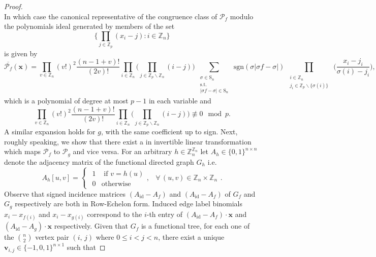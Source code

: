 \begin{proof}
\[\]
In which case the canonical representative of the congruence class of $\mathcal{P}_f$ modulo the polynomials ideal generated by members of the set
\[
\bigg\{\prod_{j\in\mathbb{Z}_{p}}(x_{i}-j):i\in\mathbb{Z}_{n}\bigg\}
\]
is given by
\begin{equation} \label{eq:new-graceful-evaluation}
\overline{\mathcal{P}_{f}}(\mathbf{x})=\prod_{v\in\mathbb{Z}_{n}}(v!)^{2}\frac{(n-1+v)!}{(2v)!}\prod_{i\in\mathbb{Z}_{n}}\big(\prod_{j\in\mathbb{Z}_{p}\backslash\mathbb{Z}_{n}}(i-j)\big)\sum_{\begin{array}{c}
\substack{\sigma\in\text{S}_{n}\\
\text{s.t.}\\
\left|\sigma f-\sigma\right|\in\text{S}_{n}
}
\end{array}}\text{sgn}(\sigma\left|\sigma f-\sigma\right|)\prod_{\begin{array}{c}
\substack{i\in\mathbb{Z}_{n}\\
j_{i}\in\mathbb{Z}_{p}\backslash\{\sigma(i)\}
}
\end{array}}\big(\frac{x_{i}-j_{i}}{\sigma(i)-j_{i}}\big),
\end{equation}
which is a polynomial of degree at most $p-1$ in each variable and
\[
\prod_{v\in\mathbb{Z}_{n}}(v!)^{2}\frac{(n-1+v)!}{(2v)!}\prod_{i\in\mathbb{Z}_{n}}\big(\prod_{j\in\mathbb{Z}_{p}\backslash\mathbb{Z}_{n}}(i-j)\big)\not\equiv0\mod p.
\]
A similar expansion holds for $g$, with the same coefficient up to sign. Next, roughly speaking, we show that there exist a in invertible linear transformation which  maps $\mathcal{P}_f$ to $\mathcal{P}_g$ and vice versa. For an arbitrary $h\in \mathbb{Z}_{n}^{\mathbb{Z}_{n}}$ let $A_{h}\in\{0,1\}^{n\times n}$ denote the adjacency matrix of the functional directed graph $G_h$ i.e.
\[
A_{h}[u,v]=\begin{cases}
\begin{array}{cc}
1 & \text{ if }v=h(u)\\
0 & \text{otherwise}
\end{array}, & \forall\,(u,v)\in\mathbb{Z}_{n}\times\mathbb{Z}_{n}\end{cases}.
\]
Observe that signed incidence matrices $(A_{\text{id}}-A_{f})$ and $(A_{\text{id}}-A_{f})$ of $G_f$ and $G_g$ respectively are both in Row-Echelon form. Induced edge label binomials $x_i-x_{f(i)}$ and $x_i-x_{g(i)}$ correspond to the $i$-th entry of $(A_{\text{id}}-A_{f})\cdot \mathbf{x}$ and $(A_{\text{id}}-A_{g})\cdot \mathbf{x}$ respectively. Given that $G_f$ is a functional tree, for each one of the ${n \choose 2}$ vertex pair $(i,\,j)$ where $0\le i < j <n$, there exist a unique $\mathbf{v}_{i,j}\in\{-1,0,1\}^{n\times1}$ such that

\end{proof}
